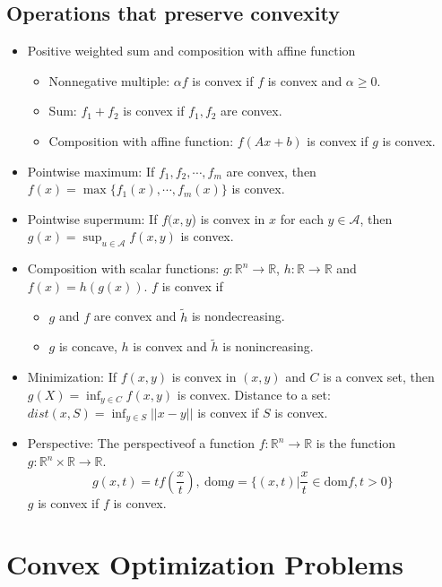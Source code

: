 \subsection{Operations that preserve convexity}
\begin{itemize}
    \item Positive weighted sum and composition with affine function
    \begin{itemize}
        \item Nonnegative multiple: $\alpha f$ is convex if $f$ is convex and $\alpha \ge 0$.
        \item Sum: $f_1 + f_2$ is convex if $f_1, f_2$ are convex.
        \item Composition with affine function: $f(Ax + b)$ is convex if $g$ is convex.
    \end{itemize}
    \item Pointwise maximum: If $f_1, f_2, \cdots, f_m$ are convex, then $f(x) = \max\{f_1(x), \cdots, f_m(x)\}$ is convex.
    \item Pointwise supermum: If $f(x, y$) is convex in $x$ for each $y \in \mathcal{A}$, then $g(x) = \sup_{u \in \mathcal{A}} f(x, y)$ is convex.
    \item Composition with scalar functions: $g: \mathbb{R}^n \rightarrow \mathbb{R}$, $h: \mathbb{R} \rightarrow \mathbb{R}$ and $f(x) = h(g(x))$. $f$ is convex if 
    \begin{itemize}
        \item $g$ and $f$ are convex and $\tilde{h}$ is nondecreasing.
        \item $g$ is concave, $h$ is convex and $\tilde{h}$ is nonincreasing.
    \end{itemize}
    \item Minimization: If $f(x, y)$ is convex in $(x, y)$ and $C$ is a convex set, then $g(X) = \inf_{y \in C} f(x, y)$ is convex. Distance to a set: $dist(x, S) = \inf_{y \in S} ||x - y||$ is convex if $S$ is convex.
    \item Perspective: The perspectiveof a function $f: \mathbb{R}^n \rightarrow \mathbb{R}$ is the function $g:\mathbb{R}^n \times \mathbb{R} \rightarrow \mathbb{R}$.
    $$
    g(x, t) = tf(\frac{x}{t}), \ \text{dom} g = \{(x, t) | \frac{x}{t} \in \text{dom} f, t > 0\}
    $$
    $g$ is convex if $f$ is convex.
\end{itemize}
\pagebreak

\section{Convex Optimization Problems}
